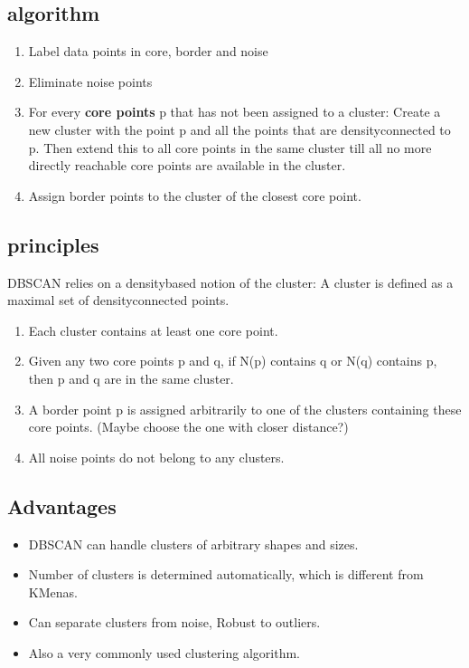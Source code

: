 \documentclass[letterpaper,12pt]{article}
\begin{document}
\subsection{algorithm}
\begin{enumerate}
    \item Label data points in core, border and noise
    \item Eliminate noise points
    \item For every \textbf{core points} p that has not been assigned to a cluster: Create a new cluster with the point p and all the points that are density\-connected to p. Then extend this to all core points in the same cluster till all no more directly reachable core points are available in the cluster.
    \item Assign border points to the cluster of the closest core point.
\end{enumerate}

\subsection{principles}
DBSCAN relies on a density\-based notion of the cluster: A cluster is defined as a maximal set of density\-connected points.
\begin{enumerate}
    \item Each cluster contains at least one core point.
    \item Given any two core points p and q, if N(p) contains q or N(q) contains p, then p and q are in the same cluster.
    \item A border point p is assigned arbitrarily to one of the clusters containing these core points. (Maybe choose the one with closer distance?)
    \item All noise points do not belong to any clusters.
\end{enumerate}

\subsection{Advantages}
\begin{itemize}
    \item DBSCAN can handle clusters of arbitrary shapes and sizes.
    \item Number of clusters is determined automatically, which is different from K\-Menas.
    \item Can separate clusters from noise, Robust to outliers.
    \item Also a very commonly used clustering algorithm.
\end{itemize}
\end{document}
